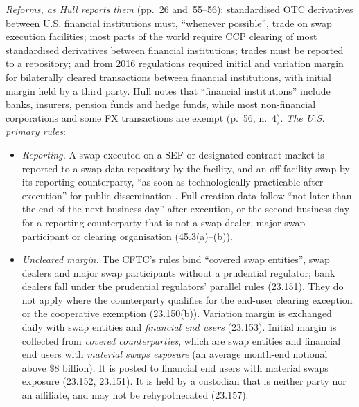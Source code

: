 \begin{qfmechanism}
 \emph{Reforms, as Hull reports them} (pp.~26 and~55--56): standardised OTC derivatives between U.S. financial institutions must, ``whenever possible'', trade on swap execution facilities; most parts of the world require CCP clearing of most standardised derivatives between financial institutions; trades must be reported to a repository; and from 2016 regulations required initial and variation margin for bilaterally cleared transactions between financial institutions, with initial margin held by a third party. Hull notes that ``financial institutions'' include banks, insurers, pension funds and hedge funds, while most non-financial corporations and some FX transactions are exempt (p.~56, n.~4). \emph{The U.S. primary rules}:
\begin{itemize}
\item \emph{Reporting.} A swap executed on a SEF or designated contract market is reported to a swap data repository by the facility, and an off-facility swap by its reporting counterparty, ``as soon as technologically practicable after execution'' for public dissemination \citep[17 CFR 43.3(a)]{ecfr-17cfr-cftc-swaps}. Full creation data follow ``not later than the end of the next business day'' after execution, or the second business day for a reporting counterparty that is not a swap dealer, major swap participant or clearing organisation (45.3(a)--(b)).
\item \emph{Uncleared margin.} The CFTC's rules bind ``covered swap entities'', swap dealers and major swap participants without a prudential regulator; bank dealers fall under the prudential regulators' parallel rules (23.151). They do not apply where the counterparty qualifies for the end-user clearing exception or the cooperative exemption (23.150(b)). Variation margin is exchanged daily with swap entities and \emph{financial end users} (23.153). Initial margin is collected from \emph{covered counterparties}, which are swap entities and financial end users with \emph{material swaps exposure} (an average month-end notional above \$8 billion). It is posted to financial end users with material swaps exposure (23.152, 23.151). It is held by a custodian that is neither party nor an affiliate, and may not be rehypothecated (23.157).


\end{itemize}
\end{qfmechanism}
